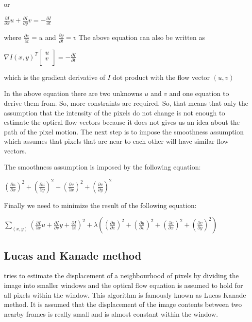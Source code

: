 \documentclass[a4paper]{aitthesis}
\begin{document}
 or 
 \begin{center}
 $\frac{\partial I}{\partial x} u + \frac{\partial I}{\partial y} v =  -\frac{\partial I}{\partial t}$
 \end{center}
where $\frac{\partial x}{\partial t} = u$ and $\frac{\partial y}{\partial t} = v$ \newline 
The above equation can also be written as
\begin{center} 
$\nabla I(x, y)^{T} \begin{bmatrix}
u \\
v\\
\end{bmatrix} = - \frac{\partial I}{\partial t}$
\end{center}
which is the gradient derivative of $I$ dot product with the flow vector $(u,v)$

In the above equation there are two unknowns $u$ and $v$ and one equation to derive them from. So, more constraints are required. So, that means that only the assumption that the intensity of the pixels do not change is not enough to estimate the optical flow vectors because it does not gives us an idea about the path of the pixel motion. The next step is to impose the smoothness assumption which assumes that pixels that are near to each other will have similar flow vectors.

The smoothness assumption is imposed by the following equation:
\begin{center}

$(\frac{\partial u}{\partial x})^2 + (\frac{\partial u}{\partial y})^2 + (\frac{\partial v}{\partial x})^2 + (\frac{\partial v}{\partial y})^2$

\end{center}

Finally we need to minimize the result of the following equation: \newline 
\begin{center}

$\sum_{(x,y)} (\frac{\partial I}{\partial x} u + \frac{\partial I}{\partial v} y + \frac{\partial I}{\partial t})^2 + \lambda ((\frac{\partial u}{\partial x})^2 + (\frac{\partial u}{\partial v})^2	+ (\frac{\partial v}{\partial x})^2 + (\frac{\partial v}{\partial y})^2)$

\end{center}
\subsection{Lucas and Kanade method}
 tries to estimate the displacement of a neighbourhood of pixels by dividing the image into smaller windows and the optical flow equation is assumed to hold for all pixels within the window. This algorithm is famously known as Lucas Kanade method. It is assumed that the displacement of the image contents between two nearby frames is really small and is almost constant within the window.
\end{document}
